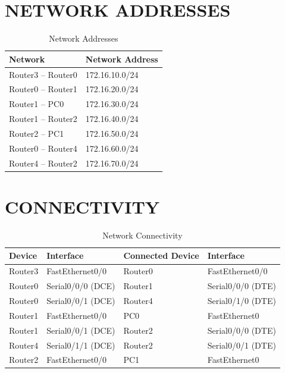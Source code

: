 \documentclass[12pt,a4paper]{article}
\begin{document}
\section*{NETWORK ADDRESSES}
\begin{table}[H]
	\centering
	\begin{tabular}{|l|l|}
		\hline
		\textbf{Network} & \textbf{Network Address} \\ \hline
		Router3 -- Router0 & 172.16.10.0/24 \\ \hline
		Router0 -- Router1 & 172.16.20.0/24 \\ \hline
		Router1 -- PC0     & 172.16.30.0/24 \\ \hline
		Router1 -- Router2 & 172.16.40.0/24 \\ \hline
		Router2 -- PC1     & 172.16.50.0/24 \\ \hline
		Router0 -- Router4 & 172.16.60.0/24 \\ \hline
		Router4 -- Router2 & 172.16.70.0/24 \\ \hline
	\end{tabular}
	\caption{Network Addresses}
\end{table}

\section*{CONNECTIVITY}
\begin{table}[H]
	\centering
	\begin{tabular}{|l|l|l|l|}
		\hline
		\textbf{Device} & \textbf{Interface} & \textbf{Connected Device} & \textbf{Interface} \\ \hline
		Router3 & FastEthernet0/0   & Router0 & FastEthernet0/0   \\ \hline
		Router0 & Serial0/0/0 (DCE) & Router1 & Serial0/0/0 (DTE) \\ \hline
		Router0 & Serial0/0/1 (DCE) & Router4 & Serial0/1/0 (DTE) \\ \hline
		Router1 & FastEthernet0/0   & PC0     & FastEthernet0     \\ \hline
		Router1 & Serial0/0/1 (DCE) & Router2 & Serial0/0/0 (DTE) \\ \hline
		Router4 & Serial0/1/1 (DCE) & Router2 & Serial0/0/1 (DTE) \\ \hline
		Router2 & FastEthernet0/0   & PC1     & FastEthernet0     \\ \hline
	\end{tabular}
	\caption{Network Connectivity}
\end{table}
\end{document}
